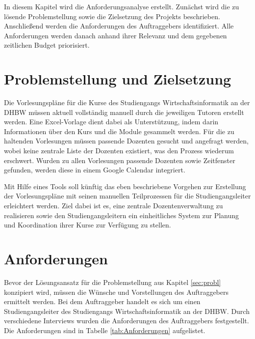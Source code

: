 \label{ch:Anforderungsanalyse}

In diesem Kapitel wird die Anforderungsanalyse erstellt.
Zunächst wird die zu lösende Problemstellung sowie die Zielsetzung des Projekts beschrieben.
Anschließend werden die Anforderungen des Auftraggebers identifiziert.
Alle Anforderungen werden danach anhand ihrer Relevanz und dem gegebenen zeitlichen Budget priorisiert.


\section{Problemstellung und Zielsetzung}\label{sec:probl}

Die Vorlesungspläne für die Kurse des Studiengangs Wirtschaftsinformatik an der \ac{DHBW} müssen aktuell vollständig manuell durch die jeweiligen Tutoren erstellt werden.
Eine Excel-Vorlage dient dabei als Unterstützung, indem darin Informationen über den Kurs und die Module gesammelt werden.
Für die zu haltenden Vorlesungen müssen passende Dozenten gesucht und angefragt werden, wobei keine zentrale Liste der Dozenten existiert, was den Prozess wiederum erschwert.
Wurden zu allen Vorlesungen passende Dozenten sowie Zeitfenster gefunden, werden diese in einem Google Calendar integriert.

Mit Hilfe eines Tools soll künftig das eben beschriebene Vorgehen zur Erstellung der Vorlesungspläne mit seinen manuellen Teilprozessen für die Studiengangsleiter erleichtert werden.
Ziel dabei ist es, eine zentrale Dozentenverwaltung zu realisieren sowie den Studiengangsleitern ein einheitliches System zur Planung und Koordination ihrer Kurse zur Verfügung zu stellen.


\section{Anforderungen}

Bevor der Lösungsansatz für die Problemstellung aus Kapitel \vref{sec:probl} konzipiert wird, müssen die Wünsche und Vorstellungen des Auftraggebers ermittelt werden.
Bei dem Auftraggeber handelt es sich um einen Studiengangsleiter des Studiengangs Wirtschaftsinformatik an der \ac{DHBW}.
Durch verschiedene Interviews wurden die Anforderungen des Auftraggebers festgestellt.
Die Anforderungen sind in Tabelle \ref{tab:Anforderungen} aufgelistet.

